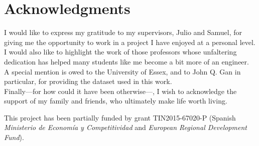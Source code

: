
\begingroup
\chapter*{Acknowledgments}

I would like to express my gratitude to my supervisors, Julio and Samuel, for giving me the opportunity to work in a project I have enjoyed at a personal level. \\

I would also like to highlight the work of those professors whose unfaltering dedication has helped many students like me become a bit more of an engineer. \\

A special mention is owed to the University of Essex, and to John Q. Gan in particular, for providing the dataset used in this work. \\

Finally---for how could it have been otherwise---, I wish to acknowledge the support of my family and friends, who ultimately make life worth living.

\vfill

This project has been partially funded by grant TIN2015-67020-P (Spanish \textit{Ministerio de Economía y Competitividad} and \textit{European Regional Development Fund}).

\endgroup
